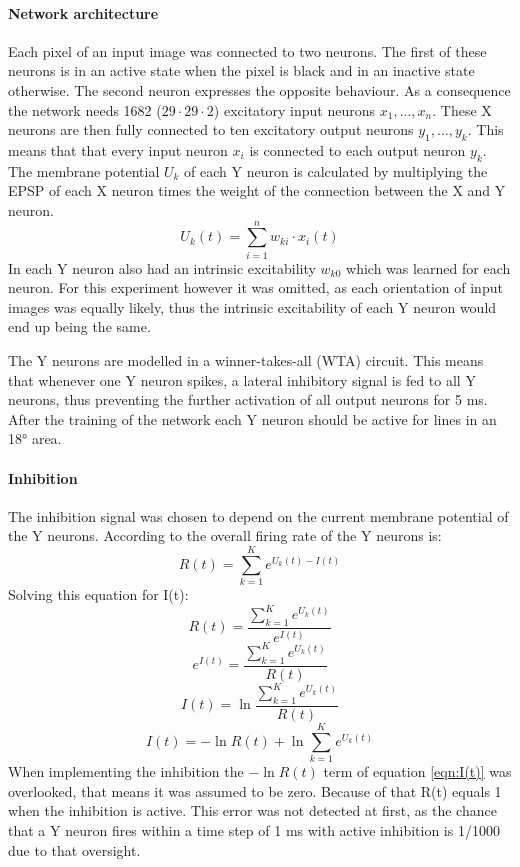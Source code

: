 \paragraph{Network architecture}
Each pixel of an input image was connected to two neurons. The first of these neurons is in an active state when the pixel is black and in an inactive state otherwise. The second neuron expresses the opposite behaviour. As a consequence the network needs 1682 ($29 \cdot 29 \cdot 2$) excitatory input neurons $x_1,...,x_n$. These X neurons are then fully connected to ten excitatory output neurons $y_1,...,y_k$. This means that that every input neuron $x_i$ is connected to each output neuron $y_k$. The membrane potential $U_k$ of each Y neuron is calculated by multiplying the EPSP of each X neuron times the weight of the connection between the X and Y neuron. 
\begin{equation}
\label{eqn:uk}
U_k(t) = \sum_{i=1}^n w_{ki} \cdot x_i(t)
\end{equation}
In \citet{nessler} each Y neuron also had an intrinsic excitability $w_{k0}$ which was learned for each neuron. For this experiment however it was omitted, as each orientation of input images was equally likely, thus the intrinsic excitability of each Y neuron would end up being the same.

The Y neurons are modelled in a winner-takes-all (WTA) circuit. This means that whenever one Y neuron spikes, a lateral inhibitory signal is fed to all Y neurons, thus preventing the further activation of all output neurons for 5 ms. After the training of the network each Y neuron should be active for lines in an 18° area. 


\paragraph{Inhibition}
The inhibition signal was chosen to depend on the current membrane potential of the Y neurons. According to \citet{nessler} the overall firing rate of the Y neurons is:
\begin{equation}
\label{eqn:R}
R(t) = \sum_{k=1}^K e^{U_k(t) - I(t)}
\end{equation}
Solving this equation for I(t):
\begin{equation}
\label{}
R(t) = \frac{ \sum_{k=1}^K e^{U_k(t)}}{e^{I(t)}}
\end{equation}
\begin{equation}
\label{}
e^{I(t)} = \frac{\sum_{k=1}^K e^{U_k(t)}}{R(t)}
\end{equation}
\begin{equation}
\label{}
I(t) = \ln{ \frac{ \sum_{k=1}^K e^{U_k(t)}}{R(t)}}
\end{equation}
\begin{equation}
\label{eqn:I(t)}
I(t) =  - \ln{R(t)} + \ln{  \sum_{k=1}^K e^{U_k(t)}}
\end{equation}
When implementing the inhibition the $- \ln{R(t)}$ term of equation \ref{eqn:I(t)} was overlooked, that means it was assumed to be zero. Because of that R(t) equals 1 when the inhibition is active. This error was not detected at first, as the chance that a Y neuron fires within a time step of 1 ms with active inhibition is 1/1000 due to that oversight.

